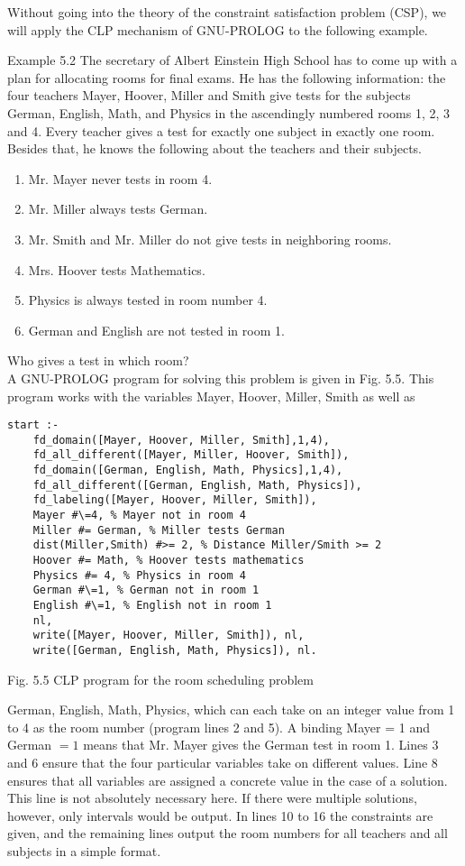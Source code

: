 \documentclass[10pt]{article}
\begin{document}
Without going into the theory of the constraint satisfaction problem (CSP), we will apply the CLP mechanism of GNU-PROLOG to the following example.

Example 5.2 The secretary of Albert Einstein High School has to come up with a plan for allocating rooms for final exams. He has the following information: the four teachers Mayer, Hoover, Miller and Smith give tests for the subjects German, English, Math, and Physics in the ascendingly numbered rooms 1, 2, 3 and 4. Every teacher gives a test for exactly one subject in exactly one room. Besides that, he knows the following about the teachers and their subjects.

\begin{enumerate}
  \item Mr. Mayer never tests in room 4.
  \item Mr. Miller always tests German.
  \item Mr. Smith and Mr. Miller do not give tests in neighboring rooms.
  \item Mrs. Hoover tests Mathematics.
  \item Physics is always tested in room number 4.
  \item German and English are not tested in room 1.
\end{enumerate}

Who gives a test in which room?\\
A GNU-PROLOG program for solving this problem is given in Fig. 5.5. This program works with the variables Mayer, Hoover, Miller, Smith as well as

\begin{verbatim}
start :-
    fd_domain([Mayer, Hoover, Miller, Smith],1,4),
    fd_all_different([Mayer, Miller, Hoover, Smith]),
    fd_domain([German, English, Math, Physics],1,4),
    fd_all_different([German, English, Math, Physics]),
    fd_labeling([Mayer, Hoover, Miller, Smith]),
    Mayer #\=4, % Mayer not in room 4
    Miller #= German, % Miller tests German
    dist(Miller,Smith) #>= 2, % Distance Miller/Smith >= 2
    Hoover #= Math, % Hoover tests mathematics
    Physics #= 4, % Physics in room 4
    German #\=1, % German not in room 1
    English #\=1, % English not in room 1
    nl,
    write([Mayer, Hoover, Miller, Smith]), nl,
    write([German, English, Math, Physics]), nl.
\end{verbatim}

Fig. 5.5 CLP program for the room scheduling problem

German, English, Math, Physics, which can each take on an integer value from 1 to 4 as the room number (program lines 2 and 5). A binding Mayer = 1 and German $=1$ means that Mr. Mayer gives the German test in room 1. Lines 3 and 6 ensure that the four particular variables take on different values. Line 8 ensures that all variables are assigned a concrete value in the case of a solution. This line is not absolutely necessary here. If there were multiple solutions, however, only intervals would be output. In lines 10 to 16 the constraints are given, and the remaining lines output the room numbers for all teachers and all subjects in a simple format.
\end{document}
